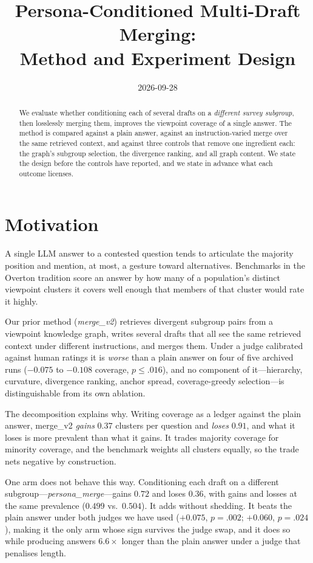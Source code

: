 \documentclass[11pt]{article}
\title{Persona-Conditioned Multi-Draft Merging:\\Method and Experiment Design}
\author{}
\date{2026-09-28}
\theoremstyle{definition}
\begin{document}
\maketitle

\begin{abstract}
We evaluate whether conditioning each of several drafts on a \emph{different
survey subgroup}, then losslessly merging them, improves the viewpoint coverage
of a single answer. The method is compared against a plain answer, against an
instruction-varied merge over the same retrieved context, and against three
controls that remove one ingredient each: the graph's subgroup selection, the
divergence ranking, and all graph content. We state the design before the
controls have reported, and we state in advance what each outcome licenses.
\end{abstract}

\section{Motivation}

A single LLM answer to a contested question tends to articulate the majority
position and mention, at most, a gesture toward alternatives. Benchmarks in the
Overton tradition score an answer by how many of a population's distinct
viewpoint clusters it covers well enough that members of that cluster would rate
it highly.

Our prior method (\emph{merge\_v2}) retrieves divergent subgroup pairs from a
viewpoint knowledge graph, writes several drafts that all see the same retrieved
context under different instructions, and merges them. Under a judge calibrated
against human ratings it is \emph{worse} than a plain answer on four of five
archived runs ($-0.075$ to $-0.108$ coverage, $p \le .016$), and no component of
it---hierarchy, curvature, divergence ranking, anchor spread, coverage-greedy
selection---is distinguishable from its own ablation.

The decomposition explains why. Writing coverage as a ledger against the plain
answer, merge\_v2 \emph{gains} $0.37$ clusters per question and \emph{loses}
$0.91$, and what it loses is more prevalent than what it gains. It trades
majority coverage for minority coverage, and the benchmark weights all clusters
equally, so the trade nets negative by construction.

One arm does not behave this way. Conditioning each draft on a different
subgroup---\emph{persona\_merge}---gains $0.72$ and loses $0.36$, with gains and
losses at the same prevalence ($0.499$ vs.\ $0.504$). It adds without shedding.
It beats the plain answer under both judges we have used ($+0.075$, $p = .002$;
$+0.060$, $p = .024$), making it the only arm whose sign survives the judge
swap, and it does so while producing answers $6.6\times$ longer than the plain
answer under a judge that penalises length.
\end{document}
